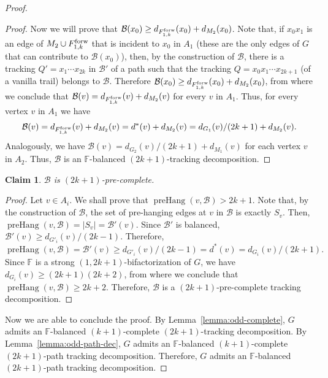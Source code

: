 \documentclass[12pt,reqno,a4paper]{amsart}
\newtheorem{claim}[theorem]{Claim}
\DeclareMathOperator{\prehang}{preHang}
\def\forw{\mathop{\text{\rm forw}}\nolimits}
\newcommand{\B}{\mathcal{B}}
\begin{document}
\begin{proof}
\begin{proof}
Now we will prove that \(\B(x_0) \geq d_{F_{1,k}^{\forw}}(x_0) + 
d_{M_2}(x_0)\). Note that, if \(x_0x_1\) is an edge of \(M_2\cup 
F_{1,k}^{\forw}\)
that is incident to \(x_0\) in \(A_1\) \big(these are the only edges of $G$ that 
can contribute to $\B(x_0)$\big), 
then, by the construction of $\B$, there is a tracking \(Q' = x_1\cdots x_{2k}\) in 
\(\B'\) of a path
such that the tracking \(Q = x_0x_1\cdots x_{2k+1}\) (of a vanilla trail) belongs to 
\(\B\).
Therefore \(\B(x_0) \geq d_{F_{1,k}^{\forw}}(x_0) + d_{M_2}(x_0)\), from where 
we conclude that
\(\B(v) = d_{F_{1,k}^{\forw}}(v) + d_{M_2}(v)\) for every \(v\) in \(A_1\).
Thus, for every vertex \(v\) in \(A_1\) we have 
\[
	\B(v)	= d_{F_{1,k}^{\forw}}(v) + d_{M_2}(v)
			= d^*(v) + d_{M_2}(v)
			= d_{G_1}(v)/(2k+1) + d_{M_2}(v).
\]
Analogously, we have \(\B(v) = d_{G_2}(v)/(2k+1) + d_{M_1}(v)\)
for each vertex \(v\) in \(A_2\).
Thus, \(\B\) is an \(\mathbb{F}\)-balanced $(2k+1)$-tracking decomposition.
\end{proof}

\begin{claim}
\(\B\) is \((2k+1)\)-pre-complete.
\end{claim}

\begin{proof}
Let \(v\in A_i\). We shall prove that \(\prehang(v,\B) > 2k+1\).
Note that, by the construction of $\B$, the set of pre-hanging edges at \(v\) in 
\(\B\) is exactly \(S_v\).
Then, \(\prehang(v,\B) = |S_v| = \B'(v)\).
Since \(\B'\) is balanced, \(\B'(v) \geq d_{G'_i}(v)/(2k-1)\).
Therefore,
\begin{equation*}
	\prehang(v,\B)	= \B'(v) 
					\geq d_{G'_i}(v)/(2k-1) 
					= d^*(v) 
					= d_{G_i}(v)/(2k+1).
\end{equation*} 
Since \(\mathbb{F}\) is a strong \((1,2k+1)\)-bifactorization of \(G\),
we have \(d_{G_i}(v) \geq (2k+1)(2k+2)\), from where we conclude that 
\(\prehang(v,\B) \geq 2k+2\).
Therefore, \(\B\) is a \((2k+1)\)-pre-complete tracking decomposition.
\end{proof}
Now we are able to conclude the proof.
By Lemma~\ref{lemma:odd-complete}, \(G\) admits an 
\(\mathbb{F}\)-balanced
\((k+1)\)-complete $(2k+1)$-tracking decomposition.
By Lemma~\ref{lemma:odd-path-dec}, \(G\) admits an 
\(\mathbb{F}\)-balanced
\((k+1)\)-complete $(2k+1)$-path tracking decomposition.
Therefore, \(G\) admits an \(\mathbb{F}\)-balanced $(2k+1)$-path tracking decomposition.
\end{proof}
\end{document}
